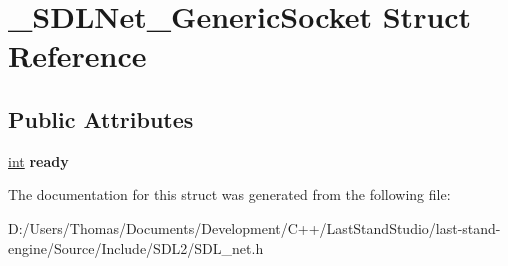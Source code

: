 \hypertarget{struct__SDLNet__GenericSocket}{}\section{\+\_\+\+S\+D\+L\+Net\+\_\+\+Generic\+Socket Struct Reference}
\label{struct__SDLNet__GenericSocket}
\subsection*{Public Attributes}
\begin{DoxyCompactItemize}
\item 
\hypertarget{struct__SDLNet__GenericSocket_a2e97834650457f62396535593b954d3e}{}\hyperlink{SDL__thread_8h_a6a64f9be4433e4de6e2f2f548cf3c08e}{int} {\bfseries ready}\label{struct__SDLNet__GenericSocket_a2e97834650457f62396535593b954d3e}

\end{DoxyCompactItemize}


The documentation for this struct was generated from the following file\+:\begin{DoxyCompactItemize}
\item 
D\+:/\+Users/\+Thomas/\+Documents/\+Development/\+C++/\+Last\+Stand\+Studio/last-\/stand-\/engine/\+Source/\+Include/\+S\+D\+L2/S\+D\+L\+\_\+net.\+h\end{DoxyCompactItemize}
